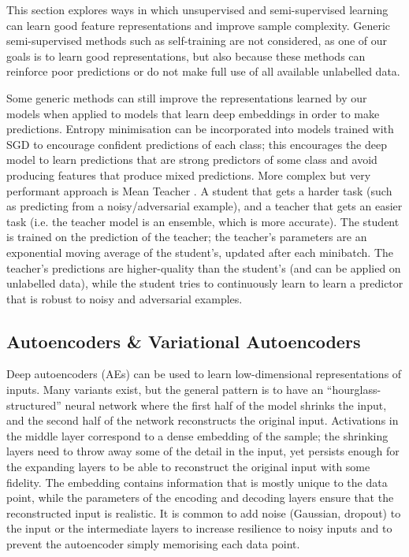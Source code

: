 This section explores ways in which unsupervised and semi-supervised learning can learn good feature representations and improve sample complexity.
Generic semi-supervised methods such as self-training are not considered, as one of our goals is to learn good representations, but also because these methods can reinforce poor predictions or do not make full use of all available unlabelled data.

Some generic methods can still improve the representations learned by our models when applied to models that learn deep embeddings in order to make predictions.
Entropy minimisation \cite{entropy_min} can be incorporated into models trained with SGD to encourage confident predictions of each class; this encourages the deep model to learn predictions that are strong predictors of some class and avoid producing features that produce mixed predictions.
More complex but very performant approach is Mean Teacher \cite{mean_teacher}. A student that gets a harder task (such as predicting from a noisy/adversarial example), and a teacher that gets an easier task (i.e. the teacher model is an ensemble, which is more accurate).
The student is trained on the prediction of the teacher; the teacher's parameters are an exponential moving average of the student's, updated after each minibatch.
The teacher's predictions are higher-quality than the student's (and can be applied on unlabelled data), while the student tries to continuously learn to learn a predictor that is robust to noisy and adversarial examples.

\subsection{Autoencoders \& Variational Autoencoders}

Deep autoencoders (AEs) can be used to learn low-dimensional representations of inputs.
Many variants exist,  but  the general pattern is to have an ``hourglass-structured'' neural network where the first half of the model shrinks the input, and the second half of the network reconstructs the original input.
Activations in the middle layer correspond to a dense embedding of the sample;  the shrinking layers need to  throw away some of the detail in the input, yet persists enough for the expanding layers to be able to reconstruct the original input with some fidelity.
The embedding contains information that is mostly unique to the data point, while the parameters of the encoding and decoding layers ensure that the reconstructed input is realistic.
It is common to add noise (Gaussian, dropout) to the input or the intermediate layers to increase resilience to noisy inputs and to prevent the autoencoder simply memorising each data point.

